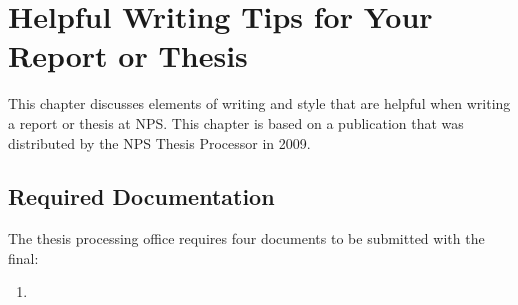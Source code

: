 \chapter{Helpful Writing Tips for Your Report or Thesis}
This chapter discusses elements of writing and style that are helpful
when writing a report or thesis at NPS. This chapter is based on a
publication that was distributed by the NPS Thesis Processor in 2009.

\section{Required Documentation}
The thesis processing office requires four documents to be submitted with the 
final:
\begin{enumerate}
\item 
\end{enumerate}

